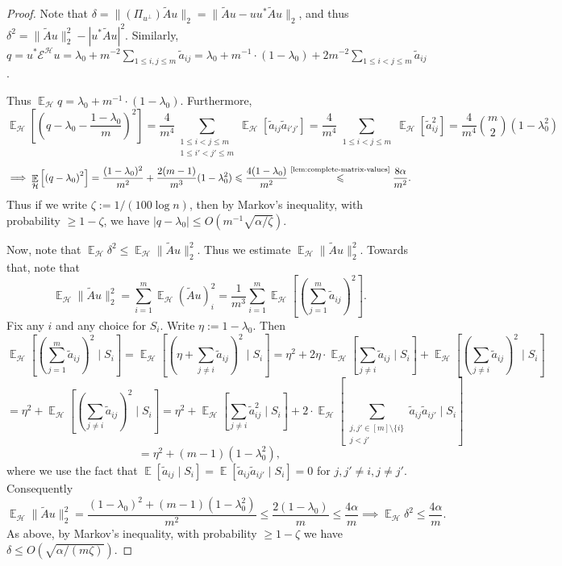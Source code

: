 \documentclass
[11pt,letterpaper]
{article}
\renewcommand{\tilde}{\widetilde}
\theoremstyle{definition}
\newcommand{\cE}{{\mathcal E}}
\newcommand{\1}{\mathbf{1}}
\newcommand{\cH}{\mathcal H}
\DeclareMathOperator*{\E}{\mathbb{E}}
\renewcommand{\geq}{\geqslant}
\renewcommand{\leq}{\leqslant}
\begin{document}
\begin{proof}
    Note that $\delta = \|(\Pi_{u^\perp})\tilde{A}u\|_2 = \|\tilde{A}u - uu^*\tilde{A}u\|_2$, and thus $\delta^2 = \|\tilde{A}u\|_2^2 - |u^*\tilde{A}u|^2$. Similarly, $q = u^*\cE^\cH u = \lambda_0 + m^{-2}\sum_{1\leq i, j\leq m}\tilde{a}_{ij} = \lambda_0 + m^{-1}\cdot(1 - \lambda_0) + 2m^{-2}\sum_{1\leq i < j\leq m}\tilde{a}_{ij}$. 

    Thus $\E_\cH q = \lambda_0 + m^{-1}\cdot(1 - \lambda_0)$. Furthermore, 
    \[\E_\cH\left[\left(q - \lambda_0 - \frac{1 - \lambda_0}{m}\right)^2\right] = \frac{4}{m^4}\sum_{\substack{1\leq i < j\leq m\\1\leq i' < j'\leq m}}\E_{\cH}[\tilde{a}_{ij}\tilde{a}_{i'j'}] = \frac{4}{m^4}\sum_{\substack{1\leq i < j\leq m}}\E_{\cH}[\tilde{a}_{ij}^2] = \frac{4}{m^4}\binom{m}{2}(1 - \lambda_0^2)\]
    \[\implies\E_\cH\left[\left(q - \lambda_0\right)^2\right] = \frac{(1 - \lambda_0)^2}{m^2} + \frac{2(m - 1)}{m^3}(1 - \lambda_0^2)\leq\frac{4(1 - \lambda_0)}{m^2}\overset{\text{\cref{lem:complete-matrix-values}}}{\leq}\frac{8\alpha}{m^2}.\]
    Thus if we write $\zeta:= 1/(100\log n)$, then by Markov's inequality, with probability $\geq 1 - \zeta$, we have $|q - \lambda_0| \leq O(m^{-1}\sqrt{\alpha/\zeta})$.
    
    
   Now, note that $\E_\cH\delta^2\leq\E_\cH\|\tilde{A}u\|_2^2$. Thus we estimate $\E_\cH\|\tilde{A}u\|_2^2$. Towards that, note that
   \[\E_\cH\|\tilde{A}u\|_2^2 = \sum_{i = 1}^m\E_\cH(\tilde{A}u)_i^2 = \frac{1}{m^3}\sum_{i = 1}^m\E_\cH\left[\left(\sum_{j = 1}^m \tilde{a}_{ij}\right)^2\right].\]
   Fix any $i$ and any choice for $S_i$. Write $\eta:= 1 - \lambda_0$. Then 
   \[\E_\cH\left[\left(\sum_{j = 1}^m \tilde{a}_{ij}\right)^2\mid S_i\right] = \E_\cH\left[\left(\eta + \sum_{j\neq i} \tilde{a}_{ij}\right)^2\mid S_i\right] = \eta^2 + 2\eta\cdot\E_\cH\left[\sum_{j\neq i} \tilde{a}_{ij}\mid S_i\right] + \E_\cH\left[\left(\sum_{j\neq i} \tilde{a}_{ij}\right)^2\mid S_i\right]\]
   \[ = \eta^2 + \E_\cH\left[\left(\sum_{j\neq i} \tilde{a}_{ij}\right)^2\mid S_i\right] = \eta^2 + \E_\cH\left[\sum_{j\neq i} \tilde{a}_{ij}^2\mid S_i\right] + 2\cdot\E_\cH\left[\sum_{\substack{j, j'\in[m]\setminus\{i\}\\j < j'}} \tilde{a}_{ij}\tilde{a}_{ij'}\mid S_i\right]\]
   \[ = \eta^2 + (m - 1)(1 - \lambda_0^2),\]
   where we use the fact that $\E[\tilde{a}_{ij}\mid S_i] = \E[\tilde{a}_{ij}\tilde{a}_{ij'}\mid S_i] = 0$ for $j, j'\neq i, j\neq j'$. Consequently 
   \[\E_\cH\|\tilde{A}u\|_2^2 = \frac{(1 - \lambda_0)^2 + (m - 1)(1 - \lambda_0^2)}{m^2}\leq \frac{2(1 - \lambda_0)}{m}\leq\frac{4\alpha}{m}\implies\E_\cH\delta^2\leq\frac{4\alpha}{m}.\]
   As above, by Markov's inequality, with probability $\geq 1 - \zeta$ we have $\delta\leq O(\sqrt{\alpha/(m\zeta)})$. 


\end{proof}
\end{document}
